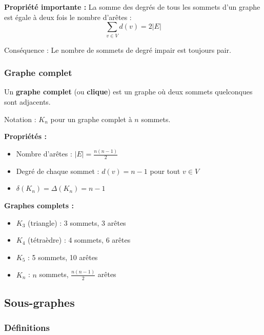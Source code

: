 \documentclass[12pt,a4paper]{article}
\begin{document}
\begin{astuce}
\textbf{Propriété importante :}
La somme des degrés de tous les sommets d'un graphe est égale à deux fois le nombre d'arêtes :
$$\sum_{v \in V} d(v) = 2|E|$$

Conséquence : Le nombre de sommets de degré impair est toujours pair.
\end{astuce}

\subsubsection{Graphe complet}

\begin{definition}
Un \textbf{graphe complet} (ou \textbf{clique}) est un graphe où deux sommets quelconques sont adjacents.

Notation : $K_n$ pour un graphe complet à $n$ sommets.

\textbf{Propriétés :}
\begin{itemize}
    \item Nombre d'arêtes : $|E| = \frac{n(n-1)}{2}$
    \item Degré de chaque sommet : $d(v) = n-1$ pour tout $v \in V$
    \item $\delta(K_n) = \Delta(K_n) = n-1$
\end{itemize}
\end{definition}

\begin{exemple}
\textbf{Graphes complets :}
\begin{itemize}
    \item $K_3$ (triangle) : 3 sommets, 3 arêtes
    \item $K_4$ (tétraèdre) : 4 sommets, 6 arêtes
    \item $K_5$ : 5 sommets, 10 arêtes
    \item $K_n$ : $n$ sommets, $\frac{n(n-1)}{2}$ arêtes
\end{itemize}
\end{exemple}

\newpage
\subsection{Sous-graphes}

\subsubsection{Définitions}
\end{document}
